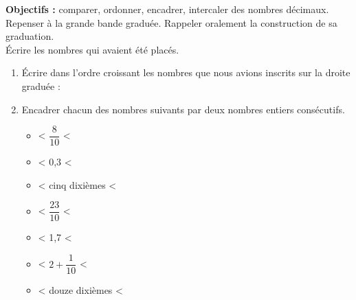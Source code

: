 \begin{changemargin}{-10mm}{-10mm}
\begin{activite}
    {\bf Objectifs :} comparer, ordonner, encadrer, intercaler des nombres décimaux.
       \partie[réinvestissement]
          Repenser à la grande bande graduée. Rappeler oralement la construction de sa graduation.\\
          Écrire les nombres qui avaient été placés.\par\medskip
          \makebox[\linewidth]{\dotfill}
       
          \begin{enumerate}
             \item Écrire dans l'ordre croissant les nombres que nous avions inscrits sur la droite graduée :\par\bigskip
             \makebox[\linewidth]{\dotfill}
             \item Encadrer chacun des nombres suivants par deux nombres entiers consécutifs.
             \begin{spacing}{1.6}
                \begin{multicols}{2}
                    \begin{itemize}
                        \item \makebox[0.2\linewidth]{\dotfill} < $\dfrac{8}{10}$ <                     \makebox[0.2\linewidth]{\dotfill}
                        \item \makebox[0.2\linewidth]{\dotfill} < 0,3 <                                 \makebox[0.2\linewidth]{\dotfill}
                        \item \makebox[0.2\linewidth]{\dotfill} < {\small cinq dixièmes} <              \makebox[0.2\linewidth]{\dotfill}
                        \item \makebox[0.2\linewidth]{\dotfill} < $\dfrac{23}{10}$ <                    \makebox[0.2\linewidth]{\dotfill}
                        \item \makebox[0.2\linewidth]{\dotfill} < 1,7 <                                 \makebox[0.2\linewidth]{\dotfill}
                        \item \makebox[0.2\linewidth]{\dotfill} < $2+\dfrac{1}{10}$ <                   \makebox[0.2\linewidth]{\dotfill}
                        \columnbreak
                        \item \makebox[0.2\linewidth]{\dotfill} < {\small douze dixièmes} <             \makebox[0.2\linewidth]{\dotfill}

\end{itemize}
\end{multicols}
\end{spacing}
\end{enumerate}
\end{activite}
\end{changemargin}
